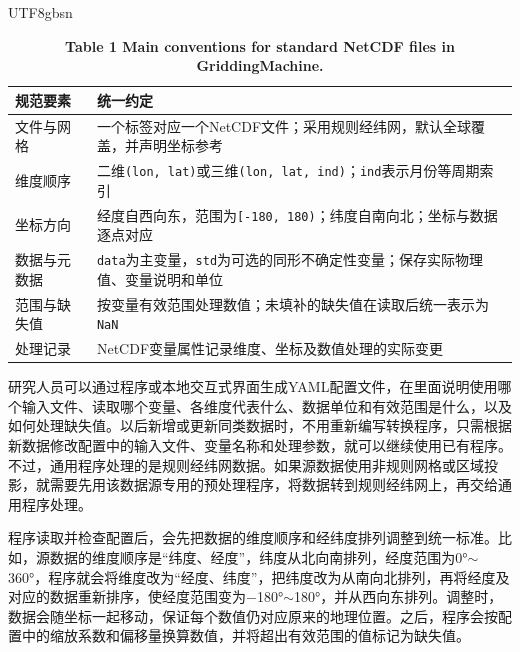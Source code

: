 \documentclass[numdoi]{chinese}
\newlength{\gmTableWidth}
\begin{document}
\begin{CJK}{UTF8}{gbsn}
\begin{table}[!htbp]\centering
\begingroup\singlespacing\small\setlength{\tabcolsep}{9pt}\renewcommand{\arraystretch}{1.12}
\captionsetup{justification=centering}
\setlength{\gmTableWidth}{\dimexpr\linewidth-2\tabcolsep\relax}
\caption*{\textbf{表1 GriddingMachine标准NetCDF文件的主要约定}}
\caption*{\textbf{Table 1 Main conventions for standard NetCDF files in GriddingMachine.}}
\begin{tabular}{@{}>{\raggedright\arraybackslash}p{0.20\gmTableWidth}>{\raggedright\arraybackslash}p{0.80\gmTableWidth}@{}}
\toprule
\textbf{规范要素} & \textbf{统一约定} \\
\midrule
文件与网格 & 一个标签对应一个NetCDF文件；采用规则经纬网，默认全球覆盖，并声明坐标参考 \\
\midrule[0.25pt]
维度顺序 & 二维\nolinkurl{(lon, lat)}或三维\nolinkurl{(lon, lat, ind)}；\nolinkurl{ind}表示月份等周期索引 \\
\midrule[0.25pt]
坐标方向 & 经度自西向东，范围为\nolinkurl{[-180, 180)}；纬度自南向北；坐标与数据逐点对应 \\
\midrule[0.25pt]
数据与元数据 & \nolinkurl{data}为主变量，\nolinkurl{std}为可选的同形不确定性变量；保存实际物理值、\allowbreak{}变量说明和单位 \\
\midrule[0.25pt]
范围与缺失值 & 按变量有效范围处理数值；未填补的缺失值在读取后统一表示为\nolinkurl{NaN} \\
\midrule[0.25pt]
处理记录 & NetCDF变量属性记录维度、\allowbreak{}坐标及数值处理的实际变更 \\
\bottomrule
\end{tabular}
\endgroup
\label{tab:1}
\end{table}

研究人员可以通过程序或本地交互式界面生成YAML配置文件，在里面说明使用哪个输入文件、\allowbreak{}读取哪个变量、\allowbreak{}各维度代表什么、\allowbreak{}数据单位和有效范围是什么，以及如何处理缺失值。以后新增或更新同类数据时，不用重新编写转换程序，只需根据新数据修改配置中的输入文件、\allowbreak{}变量名称和处理参数，就可以继续使用已有程序。不过，通用程序处理的是规则经纬网数据。如果源数据使用非规则网格或区域投影，就需要先用该数据源专用的预处理程序，将数据转到规则经纬网上，再交给通用程序处理。

程序读取并检查配置后，会先把数据的维度顺序和经纬度排列调整到统一标准。比如，源数据的维度顺序是“纬度、\allowbreak{}经度”，纬度从北向南排列，经度范围为0°\ensuremath{\sim}360°，程序就会将维度改为“经度、\allowbreak{}纬度”，把纬度改为从南向北排列，再将经度及对应的数据重新排序，使经度范围变为\ensuremath{-}180°\ensuremath{\sim}180°，并从西向东排列。调整时，数据会随坐标一起移动，保证每个数值仍对应原来的地理位置。之后，程序会按配置中的缩放系数和偏移量换算数值，并将超出有效范围的值标记为缺失值。


\end{CJK}
\end{document}
